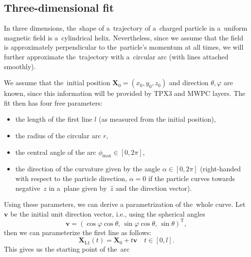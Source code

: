 		\subsection{Three-dimensional fit}
			
			In three dimensions, the~shape of a~trajectory of a~charged particle in a~uniform magnetic field is a~cylindrical helix. Nevertheless, since we assume that the field is approximately perpendicular to the~particle's momentum at all times, we will further approximate the~trajectory with a~circular arc (with lines attached smoothly).
			
			We assume that the~initial position $\mathbf{X}_0 = (x_0,y_0,z_0)$ and direction $\theta,\varphi$ are known, since this information will be provided by \ac{TPX3} and \ac{MWPC} layers. The fit then has four free parameters:
				\begin{itemize}[nosep]
					\item the length of the first line $l$ (as measured from the initial position),
					\item the radius of the circular arc $r$,
					\item the central angle of the arc $\phi_\text{max} \in [0,2\pi]$,
					\item the direction of the curvature given by the angle $\alpha \in [0,2\pi]$ (right-handed with respect to the particle direction, $\alpha = 0$ if the particle curves towards negative~$z$ in a~plane given by~$\hat{z}$ and the direction vector).
				\end{itemize}
			Using these parameters, we can derive a parametrization of the~whole curve. Let $\mathbf{v}$ be the initial unit direction vector, i.e., using the spherical angles
				\begin{equation}
					\mathbf{v} = (\cos\varphi\cos\theta, \,\sin\varphi\cos\theta, \,\sin\theta)^\mathrm{T},
				\end{equation}
			then we can parameterize the first line as follows:
				\begin{equation}
					\mathbf{X}_\text{L1}(t) = \mathbf{X}_0 + t\mathbf{v} \quad t\in[0,l].
				\end{equation}
			This gives us the starting point of the~arc
